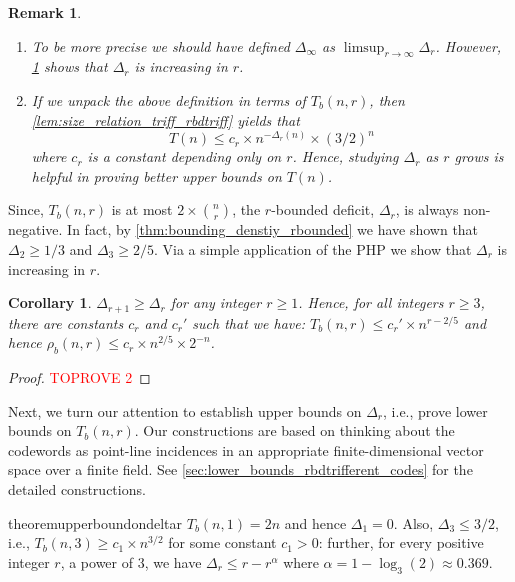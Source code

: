 \documentclass[10pt,a4paper]{article}
\newcommand{\boundeddeficit}{$r$-bounded deficit}
\newtheorem{corollary}{Corollary}[theorem]
\newtheorem{remark}[theorem]{Remark}
\DeclareMathOperator{\1}{\mathbf{1}}
\begin{document}
\begin{remark}
	\begin{enumerate}
\item To be more precise we should have defined $\Delta_\infty$ as $\limsup_{r\to \infty}\Delta_r$.
			However, \cref{cor:bouding_densityrbounded} shows that $\Delta_r$ is increasing in $r$.
\item  If we unpack the above definition in terms of $T_b(n,r)$, then \cref{lem:size_relation_triff_rbdtriff} yields that $$T(n)\leq c_r\times n^{-\Delta_r(n)}\times (3/2)^n$$ where $c_r$ is a constant depending only on $r$. Hence, studying $\Delta_r$ as $r$ grows is helpful in proving better upper bounds on $T(n)$. 
\end{enumerate}
\end{remark}

Since, $T_b(n,r)$ is at most $2\times \binom{n}{r}$, the \boundeddeficit{}, $\Delta_r$, is always non-negative.
In fact, by \cref{thm:bounding_denstiy_rbounded} we have shown that $\Delta_2\geq 1/3$ and $\Delta_3\geq 2/5$. 
Via a simple application of the PHP we show that $\Delta_r$ is increasing in $r$.
\begin{corollary}
	\label{cor:bouding_densityrbounded}
    $\Delta_{r+1}\geq \Delta_{r}$ for any integer $r\geq 1$.
	Hence, for all integers $r\geq 3$, there are constants $c_r$ and $c_r'$ such that we have: $T_b(n,r)\leq c_r'\times n^{r-2/5}$ and hence $\rho_b(n,r)\leq c_r\times n^{2/5}\times 2^{-n}$.
\end{corollary}
\begin{proof}\textcolor{red}{TOPROVE 2}\end{proof}

Next, we turn our attention to establish upper bounds on $\Delta_r$, i.e., prove lower bounds on $T_b(n,r)$. Our constructions are based on thinking about the codewords as point-line incidences in an appropriate finite-dimensional vector space over a finite field. See \cref{sec:lower_bounds_rbdtrifferent_codes} for the detailed constructions.

\begin{restatable}{theorem}{upperboundondeltar}
\label{thm:upper_bound_on_deltar}
    $T_b(n,1)= 2n$ and hence $\Delta_1 =0$. 
Also, $\Delta_3 \leq 3/2$, i.e., $T_b(n,3)\geq c_1\times n^{3/2}$ for some constant $c_1>0$: further, for every positive integer $r$, a power of $3$, we have $\Delta_r\leq r-r^{\alpha}$ where $\alpha = 1- \log_{3}(2) \approx 0.369$.
\end{restatable}
\end{document}
